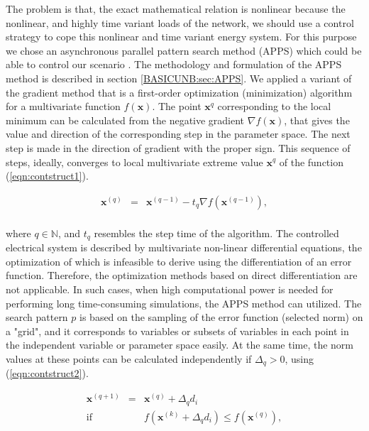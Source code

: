         The problem is that, the exact mathematical relation is nonlinear because the nonlinear, and highly time variant loads of the network, we should use a control strategy to cope this nonlinear and time variant energy system. For this purpose we chose an asynchronous parallel pattern search method (APPS) which could be able to control our scenario \cite{hough2001asynchronous}. The methodology and formulation of the APPS method is described in section \ref{BASICUNB:sec:APPS}. We applied a variant of the gradient method that is a first-order optimization (minimization) algorithm for a multivariate function $f(\textbf{x})$. The point $\textbf{x}^q$ corresponding to the local minimum can be calculated from the negative gradient $\nabla f(\textbf{x})$, that gives the value and direction of the corresponding step in the parameter space. The next step is made in the direction of gradient with the proper sign. This sequence of steps, ideally, converges to local multivariate extreme value $\textbf{x}^q$ of the function (\ref{eqn:contstruct1}).

        \begin{equation}
        \begin{array}{rcl}
        \label{eqn:contstruct1}
         \textbf{x}^{(q)}&=&\textbf{x}^{(q-1)}-t_q\nabla f(\textbf{x}^{(q-1)}),\\
         \end{array}
        \end{equation}

        where $q\in\mathbb{N}$, and $t_q$ resembles the step time of the algorithm. The controlled electrical system is described by multivariate non-linear differential equations, the optimization of which is infeasible to derive using the differentiation of an error function. Therefore, the optimization methods based on direct differentiation are not applicable. In such cases, when high computational power is needed for performing long time-consuming simulations, the APPS method can utilized. The search pattern $p$ is based on the sampling of the error function (selected norm) on a "grid", and it corresponds to variables or subsets of variables in each point in the independent variable or parameter space easily. At the same time, the norm values at these points can be calculated independently if $\Delta_q>0$, using (\ref{eqn:contstruct2}).
				
        \begin{equation}
        \label{eqn:contstruct2}
        \begin{array}{rcl}
         \textbf{x}^{(q+1)}&=&\textbf{x}^{(q)}+\Delta_qd_i \\
         \mathrm{if}&&f(\textbf{x}^{(k)}+\Delta_qd_i) \leq f(\textbf{x}^{(q)}),\\
         \end{array}
        \end{equation}

